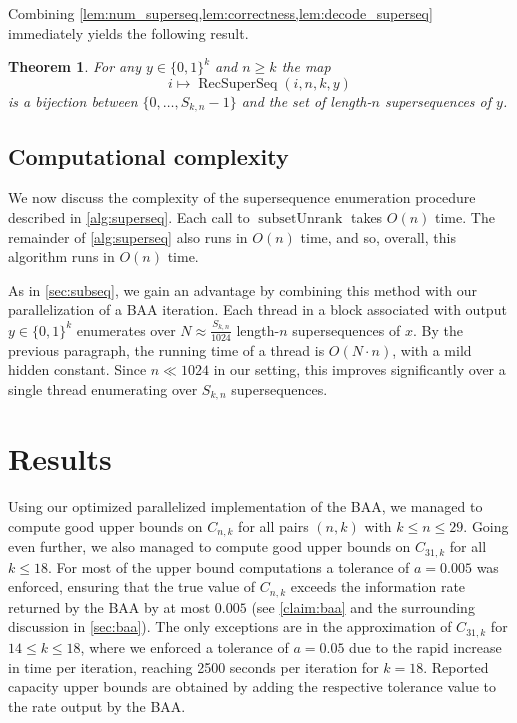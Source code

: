 \documentclass[11pt]{article}
\newcommand{\recsuper}{\operatorname{RecSuperSeq}}
\newcommand{\subunrank}{\operatorname{subsetUnrank}}
\newtheorem{theorem}{Theorem}
\newcommand{\bits}{\{0,1\}}
\begin{document}
Combining \cref{lem:num_superseq,lem:correctness,lem:decode_superseq} immediately yields the following result.
\begin{theorem}
For any $y\in\{0,1\}^k$ and $n\ge k$ the map
\[
i \mapsto \recsuper(i,n,k,y)
\]
is a bijection between $\{0,\dots,S_{k,n}-1\}$ and the set of length-$n$ supersequences of $y$.
\end{theorem}




\subsection{Computational complexity}


We now discuss the complexity of the supersequence enumeration procedure described in \cref{alg:superseq}.
Each call to $\subunrank$ takes $O(n)$ time.
The remainder of \cref{alg:superseq} also runs in $O(n)$ time, and so, overall, this algorithm runs in $O(n)$ time.

As in \cref{sec:subseq}, we gain an advantage by combining this method with our parallelization of a BAA iteration.
Each thread in a block associated with output $y\in\bits^k$ enumerates over $N\approx \frac{S_{k,n}}{1024}$ length-$n$ supersequences of $x$.
By the previous paragraph, the running time of a thread is $O(N\cdot n)$, with a mild hidden constant.
Since $n\ll 1024$ in our setting, this improves significantly over a single thread enumerating over $S_{k,n}$ supersequences.









\section{Results}
\label{sec:results}
 
Using our optimized parallelized implementation of the BAA, we managed to compute good upper bounds on $C_{n,k}$ for all pairs $(n,k)$ with $k \le n \leq 29$.
Going even further, we also managed to compute good upper bounds on $C_{31,k}$ for all $k\leq 18$.
For most of the upper bound computations a tolerance of $a=0.005$ was enforced, ensuring that the true value of $C_{n,k}$ exceeds the information rate returned by the BAA by at most $0.005$ (see \cref{claim:baa} and the surrounding discussion in \cref{sec:baa}). 
The only exceptions are in the approximation of $C_{31,k}$ for $14 \leq k \leq 18$, where we enforced a tolerance of $a = 0.05$ due to the rapid increase in time per iteration, reaching 2500 seconds per iteration for $k = 18$.
Reported capacity upper bounds are obtained by adding the respective tolerance value to the rate output by the BAA.
\end{document}
